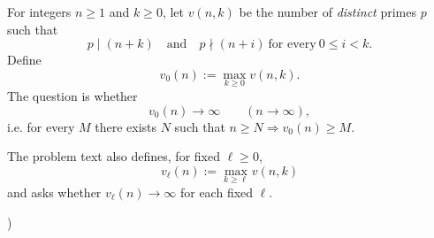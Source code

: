\noindent For integers $n\ge 1$ and $k\ge 0$, let $v(n,k)$ be the number of \emph{distinct} primes $p$ such that
\[
 p\mid (n+k)\quad\text{and}\quad p\nmid (n+i)\ \text{for every}\ 0\le i<k.
\]
Define
\[
 v_0(n) := \max_{k\ge 0} v(n,k).
\]
The question is whether
\[
 v_0(n) \longrightarrow \infty \qquad (n\to\infty),
\]
i.e. for every $M$ there exists $N$ such that $n\ge N\Rightarrow v_0(n)\ge M$.

\noindent The problem text also defines, for fixed $\ell\ge 0$,
\[
 v_\ell(n) := \max_{k\ge \ell} v(n,k)
\]
and asks whether $v_\ell(n)\to\infty$ for each fixed $\ell$.

)
